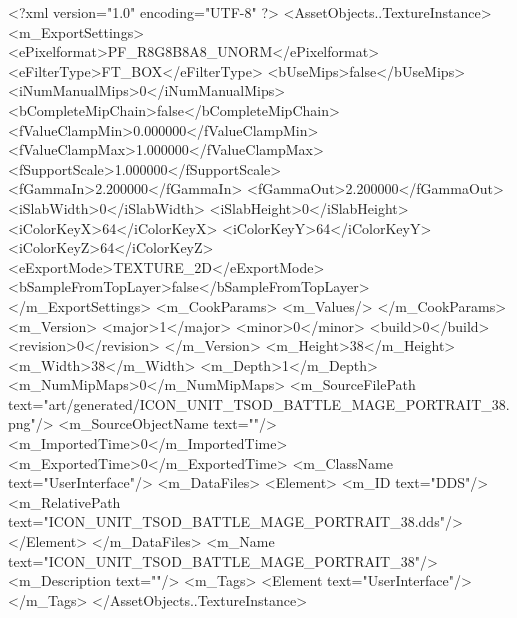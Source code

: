 <?xml version="1.0" encoding="UTF-8" ?>
<AssetObjects..TextureInstance>
	<m_ExportSettings>
		<ePixelformat>PF_R8G8B8A8_UNORM</ePixelformat>
		<eFilterType>FT_BOX</eFilterType>
		<bUseMips>false</bUseMips>
		<iNumManualMips>0</iNumManualMips>
		<bCompleteMipChain>false</bCompleteMipChain>
		<fValueClampMin>0.000000</fValueClampMin>
		<fValueClampMax>1.000000</fValueClampMax>
		<fSupportScale>1.000000</fSupportScale>
		<fGammaIn>2.200000</fGammaIn>
		<fGammaOut>2.200000</fGammaOut>
		<iSlabWidth>0</iSlabWidth>
		<iSlabHeight>0</iSlabHeight>
		<iColorKeyX>64</iColorKeyX>
		<iColorKeyY>64</iColorKeyY>
		<iColorKeyZ>64</iColorKeyZ>
		<eExportMode>TEXTURE_2D</eExportMode>
		<bSampleFromTopLayer>false</bSampleFromTopLayer>
	</m_ExportSettings>
	<m_CookParams>
		<m_Values/>
	</m_CookParams>
	<m_Version>
		<major>1</major>
		<minor>0</minor>
		<build>0</build>
		<revision>0</revision>
	</m_Version>
	<m_Height>38</m_Height>
	<m_Width>38</m_Width>
	<m_Depth>1</m_Depth>
	<m_NumMipMaps>0</m_NumMipMaps>
	<m_SourceFilePath text="art/generated/ICON_UNIT_TSOD_BATTLE_MAGE_PORTRAIT_38.png"/>
	<m_SourceObjectName text=""/>
	<m_ImportedTime>0</m_ImportedTime>
	<m_ExportedTime>0</m_ExportedTime>
	<m_ClassName text="UserInterface"/>
	<m_DataFiles>
		<Element>
			<m_ID text="DDS"/>
			<m_RelativePath text="ICON_UNIT_TSOD_BATTLE_MAGE_PORTRAIT_38.dds"/>
		</Element>
	</m_DataFiles>
	<m_Name text="ICON_UNIT_TSOD_BATTLE_MAGE_PORTRAIT_38"/>
	<m_Description text=""/>
	<m_Tags>
		<Element text="UserInterface"/>
	</m_Tags>
</AssetObjects..TextureInstance>
